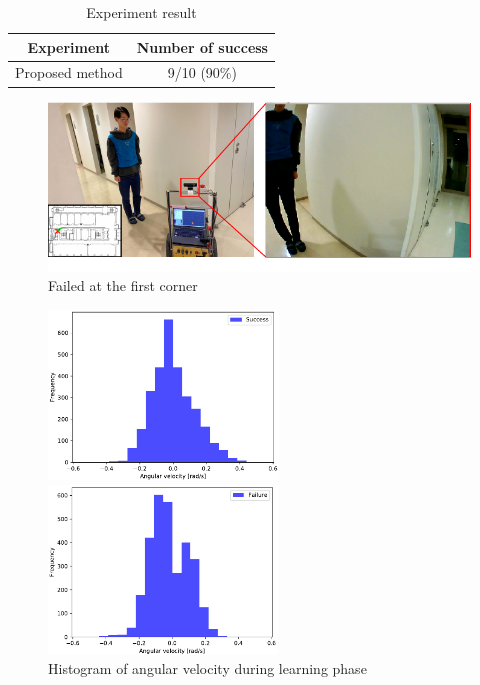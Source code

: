   \begin{table}[h]
    \caption{Experiment result}
    \label{tab:Experiment result}
    \centering
    \begin{tabular}{|c|c|}
    \hline
    \hline
    Experiment & Number of success    \\ 
    \hline
    \hline
    Proposed method & 9/10 (90\%) \\ 
    \hline
    \end{tabular}
    \end{table}

  \begin{figure}[h]
    \centering
    \includegraphics[keepaspectratio, scale=0.80] {images/pdf/RobotGuidance_failed_place}
    \captionsetup{justification=raggedright} %
    \caption{Failed at the first corner}
    \label{Fig:RobotGuidance_failed_place}
  \end{figure}

  \begin{figure}[h]
    \centering
    \begin{minipage}[c]{65mm} 
        \centering
        \includegraphics[height=45mm]{images/pdf/RobotGuidance_success_histogram}
    \end{minipage}
    \begin{minipage}[c]{65mm} 
        \centering
        \includegraphics[height=45mm]{images/pdf/RobotGuidance_failed_histogram}
    \end{minipage}
    \caption{Histogram of angular velocity during learning phase}
    \label{Fig:Histogram of angular velocity}
  \end{figure}

\newpage
